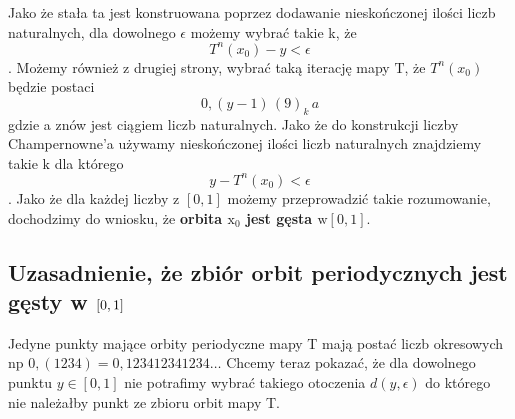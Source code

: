 \documentclass[12pt,a4paper]{article}
\renewcommand{\emph}{\textbf}
\begin{document}
Jako że stała ta jest konstruowana poprzez dodawanie nieskończonej ilości liczb naturalnych, dla dowolnego $\epsilon$ możemy wybrać takie k, że 
$$T^{n}\left(x_{0}\right)-y<\epsilon$$. 
Możemy również z drugiej strony, wybrać taką iterację mapy $\mathrm{T}$, że $T^{n}\left(x_{0}\right)$ będzie postaci 
$$0,(y-1)\,(9)_{k} \,a$$ 
gdzie a znów jest ciągiem liczb naturalnych. Jako że do konstrukcji liczby Champernowne'a używamy nieskończonej ilości liczb naturalnych znajdziemy takie $\mathrm{k}$ dla którego $$y-T^{n}\left(x_{0}\right)<\epsilon$$. 
Jako że dla każdej liczby z $[0,1]$ możemy przeprowadzić takie rozumowanie, dochodzimy do wniosku, że \emph{orbita $\mathrm{x}_{0}$ jest gęsta $\mathrm{w}[0,1]$}.

\subsection{Uzasadnienie, że zbiór orbit periodycznych jest gęsty w $\qty[0,1]$}

Jedyne punkty mające orbity periodyczne mapy T mają postać liczb okresowych np $0,(1234)=0,123412341234 \ldots$ Chcemy teraz pokazać, że dla dowolnego punktu $y \in[0,1]$ nie potrafimy wybrać takiego otoczenia $d(y, \epsilon)$ do którego nie należałby punkt ze zbioru orbit mapy T. 
\end{document}
